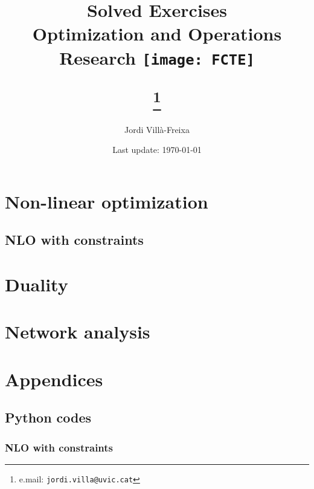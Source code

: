 \documentclass[12pt]{article}
\begin{document}
\title{Solved Exercises \\ \large Optimization and Operations Research \newline \newline \texttt{[image: FCTE]}
\author{Jordi Villà-Freixa}
\thanks{e.mail: \texttt{jordi.villa@uvic.cat}}}

\date{Last update: \today}
\maketitle
\tableofcontents
\listofexercises
\newpage

\begin{ExerciseList}
\section{Non-linear optimization}

\subsection{NLO with constraints}




\section{Duality}



\section{Network analysis}

\end{ExerciseList}

\section{Appendices}

\subsection{Python codes}

\lstlistoflistings

\subsubsection{NLO with constraints}





\end{document}
